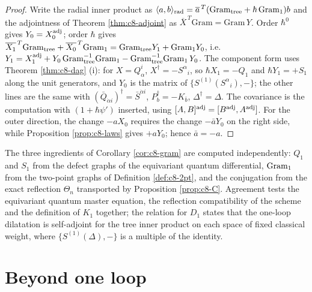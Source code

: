 \begin{proof}
Write the radial inner product as $\langle a,b\rangle_{\rm rad}=\overline a^{\,T}(\mathrm{Gram}_{\rm tree}+\hbar\,\mathrm{Gram}_{\rm 1})b$ and the adjointness of Theorem \ref{thm:c8-adjoint} as $\overline{X}^{\,T}\mathrm{Gram}=\mathrm{Gram}\,Y$. Order $\hbar^0$ gives $Y_0=X_0^{\rm adj}$; order $\hbar$ gives $\overline{X_1}^{\,T}\mathrm{Gram}_{\rm tree}+\overline{X_0}^{\,T}\mathrm{Gram}_{\rm 1}=\mathrm{Gram}_{\rm tree}Y_1+\mathrm{Gram}_{\rm 1}Y_0$, i.e. $Y_1=X_1^{\rm adj}+Y_0\,\mathrm{Gram}_{\rm tree}^{-1}\mathrm{Gram}_{\rm 1}-\mathrm{Gram}_{\rm tree}^{-1}\mathrm{Gram}_{\rm 1}\,Y_0$. The component form uses Theorem \ref{thm:c8-dag} (i): for $X=Q^i_\alpha$, $X^\dagger=-S^\alpha{}_i$, so $\hbar X_1=-Q_1$ and $\hbar Y_1=+S_1$ along the unit generators, and $Y_0$ is the matrix of $\{S^{(1)}(S^\alpha{}_i),-\}$; the other lines are the same with $(\bar Q_{\dot\alpha i})^\dagger=\bar S^{\dot\alpha i}$, $P_b^\dagger=-K_{\bar b}$, $\Delta^\dagger=\Delta$. The covariance is the computation with $(1+\hbar\psi')$ inserted, using $[A,B]^{\rm adj}=[B^{\rm adj},A^{\rm adj}]$. For the outer direction, the change $-aX_0$ requires the change $-\bar aY_0$ on the right side, while Proposition \ref{prop:c8-laws} gives $+aY_0$; hence $\bar a=-a$.
\end{proof}

\begin{remark}
The three ingredients of Corollary \ref{cor:c8-gram} are computed independently: $Q_1$ and $S_1$ from the defect graphs of the equivariant quantum differential, $\mathrm{Gram}_{\rm 1}$ from the two-point graphs of Definition \ref{def:c8-2pt}, and the conjugation from the exact reflection $\Theta_n$ transported by Proposition \ref{prop:c8-C}. Agreement tests the equivariant quantum master equation, the reflection compatibility of the scheme and the definition of $K_1$ together; the relation for $D_1$ states that the one-loop dilatation is self-adjoint for the tree inner product on each space of fixed classical weight, where $\{S^{(1)}(\Delta),-\}$ is a multiple of the identity.
\end{remark}

\section{Beyond one loop}


